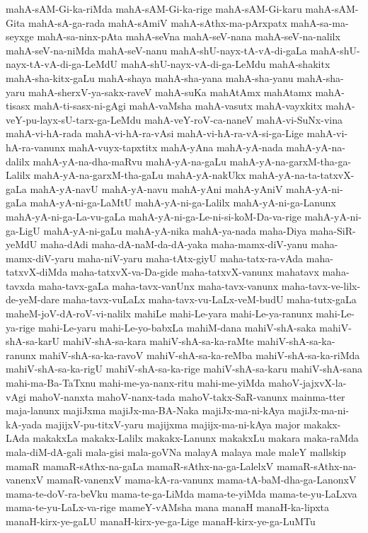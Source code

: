 {mahA-sAM-Gi-ka-riMda
mahA-sAM-Gi-ka-rige
mahA-sAM-Gi-karu
mahA-sAM-Gita
mahA-sA-ga-rada
mahA-sAmiV
mahA-sAthx-ma-pArxpatx
mahA-sa-ma-seyxge
mahA-sa-ninx-pAta
mahA-seVna
mahA-seV-nana
mahA-seV-na-nalilx
mahA-seV-na-niMda
mahA-seV-nanu
mahA-shU-nayx-tA-vA-di-gaLa
mahA-shU-nayx-tA-vA-di-ga-LeMdU
mahA-shU-nayx-vA-di-ga-LeMdu
mahA-shakitx
mahA-sha-kitx-gaLu
mahA-shaya
mahA-sha-yana
mahA-sha-yanu
mahA-sha-yaru
mahA-sherxV-ya-sakx-raveV
mahA-suKa
mahAtAmx
mahAtamx
mahA-tisasx
mahA-ti-sasx-ni-gAgi
mahA-vaMsha
mahA-vasutx
mahA-vayxkitx
mahA-veY-pu-layx-sU-tarx-ga-LeMdu
mahA-veY-roV-ca-naneV
mahA-vi-SuNx-vina
mahA-vi-hA-rada
mahA-vi-hA-ra-vAsi
mahA-vi-hA-ra-vA-si-ga-Lige
mahA-vi-hA-ra-vanunx
mahA-vuyx-tapxtitx
mahA-yAna
mahA-yA-nada
mahA-yA-na-dalilx
mahA-yA-na-dha-maRvu
mahA-yA-na-gaLu
mahA-yA-na-garxM-tha-ga-Lalilx
mahA-yA-na-garxM-tha-gaLu
mahA-yA-nakUkx
mahA-yA-na-ta-tatxvX-gaLa
mahA-yA-navU
mahA-yA-navu
mahA-yAni
mahA-yAniV
mahA-yA-ni-gaLa
mahA-yA-ni-ga-LaMtU
mahA-yA-ni-ga-Lalilx
mahA-yA-ni-ga-Lanunx
mahA-yA-ni-ga-La-vu-gaLa
mahA-yA-ni-ga-Le-ni-si-koM-Da-va-rige
mahA-yA-ni-ga-LigU
mahA-yA-ni-gaLu
mahA-yA-nika
mahA-ya-nada
maha-Diya
maha-SiR-yeMdU
maha-dAdi
maha-dA-naM-da-dA-yaka
maha-mamx-diV-yanu
maha-mamx-diV-yaru
maha-niV-yaru
maha-tAtx-giyU
maha-tatx-ra-vAda
maha-tatxvX-diMda
maha-tatxvX-va-Da-gide
maha-tatxvX-vanunx
mahatavx
maha-tavxda
maha-tavx-gaLa
maha-tavx-vanUnx
maha-tavx-vanunx
maha-tavx-ve-lilx-de-yeM-dare
maha-tavx-vuLaLx
maha-tavx-vu-LaLx-veM-budU
maha-tutx-gaLa
maheM-joV-dA-roV-vi-nalilx
mahiLe
mahi-Le-yara
mahi-Le-ya-ranunx
mahi-Le-ya-rige
mahi-Le-yaru
mahi-Le-yo-babxLa
mahiM-dana
mahiV-shA-saka
mahiV-shA-sa-karU
mahiV-shA-sa-kara
mahiV-shA-sa-ka-raMte
mahiV-shA-sa-ka-ranunx
mahiV-shA-sa-ka-ravoV
mahiV-shA-sa-ka-reMba
mahiV-shA-sa-ka-riMda
mahiV-shA-sa-ka-rigU
mahiV-shA-sa-ka-rige
mahiV-shA-sa-karu
mahiV-shA-sana
mahi-ma-Ba-TaTxnu
mahi-me-ya-nanx-ritu
mahi-me-yiMda
mahoV-jajxvX-la-vAgi
mahoV-nanxta
mahoV-nanx-tada
mahoV-takx-SaR-vanunx
mainma-tter
maja-lanunx
majiJxma
majiJx-ma-BA-Naka
majiJx-ma-ni-kAya
majiJx-ma-ni-kA-yada
majijxV-pu-titxV-yaru
majijxma
majijx-ma-ni-kAya
major
makakx-LAda
makakxLa
makakx-Lalilx
makakx-Lanunx
makakxLu
makara
maka-raMda
mala-diM-dA-gali
mala-gisi
mala-goVNa
malayA
malaya
male
maleY
mallskip
mamaR
mamaR-sAthx-na-gaLa
mamaR-sAthx-na-ga-LalelxV
mamaR-sAthx-na-vanenxV
mamaR-vanenxV
mama-kA-ra-vanunx
mama-tA-baM-dha-ga-LanonxV
mama-te-doV-ra-beVku
mama-te-ga-LiMda
mama-te-yiMda
mama-te-yu-LaLxva
mama-te-yu-LaLx-va-rige
mameY-vAMsha
mana
manaH
manaH-ka-lipxta
manaH-kirx-ye-gaLU
manaH-kirx-ye-ga-Lige
manaH-kirx-ye-ga-LuMTu
}

